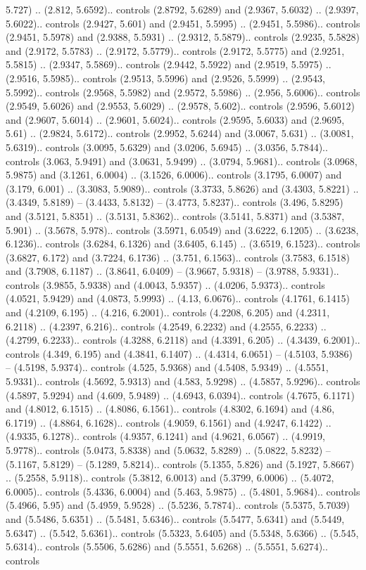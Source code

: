 5.727) .. (2.812, 5.6592).. controls (2.8792, 5.6289) and (2.9367, 5.6032) .. (2.9397, 5.6022).. controls (2.9427, 5.601) and (2.9451, 5.5995) .. (2.9451, 5.5986).. controls (2.9451, 5.5978) and (2.9388, 5.5931) .. (2.9312, 5.5879).. controls (2.9235, 5.5828) and (2.9172, 5.5783) .. (2.9172, 5.5779).. controls (2.9172, 5.5775) and (2.9251, 5.5815) .. (2.9347, 5.5869).. controls (2.9442, 5.5922) and (2.9519, 5.5975) .. (2.9516, 5.5985).. controls (2.9513, 5.5996) and (2.9526, 5.5999) .. (2.9543, 5.5992).. controls (2.9568, 5.5982) and (2.9572, 5.5986) .. (2.956, 5.6006).. controls (2.9549, 5.6026) and (2.9553, 5.6029) .. (2.9578, 5.602).. controls (2.9596, 5.6012) and (2.9607, 5.6014) .. (2.9601, 5.6024).. controls (2.9595, 5.6033) and (2.9695, 5.61) .. (2.9824, 5.6172).. controls (2.9952, 5.6244) and (3.0067, 5.631) .. (3.0081, 5.6319).. controls (3.0095, 5.6329) and (3.0206, 5.6945) .. (3.0356, 5.7844).. controls (3.063, 5.9491) and (3.0631, 5.9499) .. (3.0794, 5.9681).. controls (3.0968, 5.9875) and (3.1261, 6.0004) .. (3.1526, 6.0006).. controls (3.1795, 6.0007) and (3.179, 6.001) .. (3.3083, 5.9089).. controls (3.3733, 5.8626) and (3.4303, 5.8221) .. (3.4349, 5.8189) -- (3.4433, 5.8132) -- (3.4773, 5.8237).. controls (3.496, 5.8295) and (3.5121, 5.8351) .. (3.5131, 5.8362).. controls (3.5141, 5.8371) and (3.5387, 5.901) .. (3.5678, 5.978).. controls (3.5971, 6.0549) and (3.6222, 6.1205) .. (3.6238, 6.1236).. controls (3.6284, 6.1326) and (3.6405, 6.145) .. (3.6519, 6.1523).. controls (3.6827, 6.172) and (3.7224, 6.1736) .. (3.751, 6.1563).. controls (3.7583, 6.1518) and (3.7908, 6.1187) .. (3.8641, 6.0409) -- (3.9667, 5.9318) -- (3.9788, 5.9331).. controls (3.9855, 5.9338) and (4.0043, 5.9357) .. (4.0206, 5.9373).. controls (4.0521, 5.9429) and (4.0873, 5.9993) .. (4.13, 6.0676).. controls (4.1761, 6.1415) and (4.2109, 6.195) .. (4.216, 6.2001).. controls (4.2208, 6.205) and (4.2311, 6.2118) .. (4.2397, 6.216).. controls (4.2549, 6.2232) and (4.2555, 6.2233) .. (4.2799, 6.2233).. controls (4.3288, 6.2118) and (4.3391, 6.205) .. (4.3439, 6.2001).. controls (4.349, 6.195) and (4.3841, 6.1407) .. (4.4314, 6.0651) -- (4.5103, 5.9386) -- (4.5198, 5.9374).. controls (4.525, 5.9368) and (4.5408, 5.9349) .. (4.5551, 5.9331).. controls (4.5692, 5.9313) and (4.583, 5.9298) .. (4.5857, 5.9296).. controls (4.5897, 5.9294) and (4.609, 5.9489) .. (4.6943, 6.0394).. controls (4.7675, 6.1171) and (4.8012, 6.1515) .. (4.8086, 6.1561).. controls (4.8302, 6.1694) and (4.86, 6.1719) .. (4.8864, 6.1628).. controls (4.9059, 6.1561) and (4.9247, 6.1422) .. (4.9335, 6.1278).. controls (4.9357, 6.1241) and (4.9621, 6.0567) .. (4.9919, 5.9778).. controls (5.0473, 5.8338) and (5.0632, 5.8289) .. (5.0822, 5.8232) -- (5.1167, 5.8129) -- (5.1289, 5.8214).. controls (5.1355, 5.826) and (5.1927, 5.8667) .. (5.2558, 5.9118).. controls (5.3812, 6.0013) and (5.3799, 6.0006) .. (5.4072, 6.0005).. controls (5.4336, 6.0004) and (5.463, 5.9875) .. (5.4801, 5.9684).. controls (5.4966, 5.95) and (5.4959, 5.9528) .. (5.5236, 5.7874).. controls (5.5375, 5.7039) and (5.5486, 5.6351) .. (5.5481, 5.6346).. controls (5.5477, 5.6341) and (5.5449, 5.6347) .. (5.542, 5.6361).. controls (5.5323, 5.6405) and (5.5348, 5.6366) .. (5.545, 5.6314).. controls (5.5506, 5.6286) and (5.5551, 5.6268) .. (5.5551, 5.6274).. controls 
